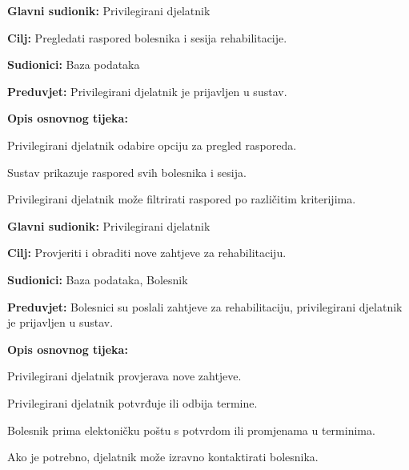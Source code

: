 \vspace{1em} %
\noindent{}
\begin{packed_item}
	\item \textbf{Glavni sudionik:} Privilegirani djelatnik
	\item \textbf{Cilj:} Pregledati raspored bolesnika i sesija rehabilitacije.
	\item \textbf{Sudionici:} Baza podataka
	\item \textbf{Preduvjet:} Privilegirani djelatnik je prijavljen u sustav.
	\item \textbf{Opis osnovnog tijeka:}
	\begin{packed_enum}
		\item Privilegirani djelatnik odabire opciju za pregled rasporeda.
		\item Sustav prikazuje raspored svih bolesnika i sesija.
		\item Privilegirani djelatnik može filtrirati raspored po različitim kriterijima.
	\end{packed_enum}
\end{packed_item}

\vspace{1em} %
\noindent{}
\begin{packed_item}
	\item \textbf{Glavni sudionik:} Privilegirani djelatnik
	\item \textbf{Cilj:} Provjeriti i obraditi nove zahtjeve za rehabilitaciju.
	\item \textbf{Sudionici:} Baza podataka, Bolesnik
	\item \textbf{Preduvjet:} Bolesnici su poslali zahtjeve za rehabilitaciju, privilegirani djelatnik je prijavljen u sustav.
	\item \textbf{Opis osnovnog tijeka:}
	\begin{packed_enum}
		\item Privilegirani djelatnik provjerava nove zahtjeve.
		\item Privilegirani djelatnik potvrđuje ili odbija termine.
		\item Bolesnik prima elektoničku poštu s potvrdom ili promjenama u terminima.
		\item Ako je potrebno, djelatnik može izravno kontaktirati bolesnika.
	\end{packed_enum}
\end{packed_item}

